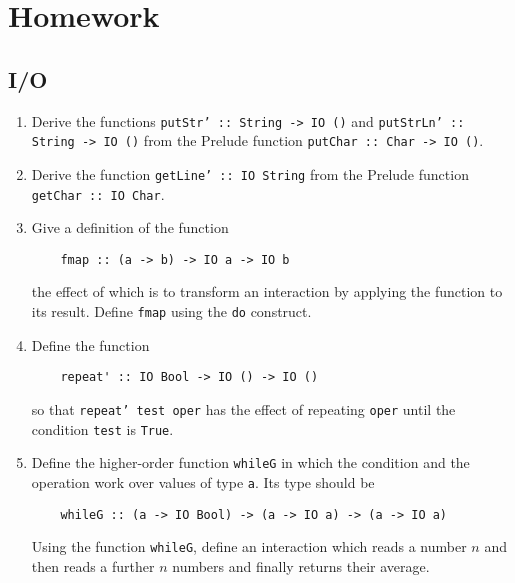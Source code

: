 \documentclass{article}
\def\code#1{\texttt{#1}}
\begin{document}
\section{Homework}

\subsection{I/O}
\begin{enumerate}
    \item Derive the functions \code{putStr' :: String -> IO ()} and \code{putStrLn' :: String -> IO ()} from the Prelude function \code{putChar :: Char -> IO ()}.

    \item Derive the function \code{getLine' :: IO String} from the Prelude function \code{getChar :: IO Char}.

    \item \cite[p. 461]{thompson} Give a definition of the function
        \begin{verbatim}
    fmap :: (a -> b) -> IO a -> IO b
        \end{verbatim}
        the effect of which is to transform an interaction by applying the function to its result. Define \code{fmap} using the \code{do} construct.

    \item \cite[p. 461]{thompson} Define the function
        \begin{verbatim}
    repeat' :: IO Bool -> IO () -> IO ()
        \end{verbatim}
        so that \code{repeat' test oper} has the effect of repeating \code{oper} until the condition \code{test} is \code{True}.

    \item \cite[p. 461]{thompson} Define the higher-order function \code{whileG} in which the condition and the operation work over values of type \code{a}. Its type should be
        \begin{verbatim}
    whileG :: (a -> IO Bool) -> (a -> IO a) -> (a -> IO a)
        \end{verbatim}
        Using the function \code{whileG}, define an interaction which reads a number $n$ and then reads a further $n$ numbers and finally returns their average.


\end{enumerate}
\end{document}
